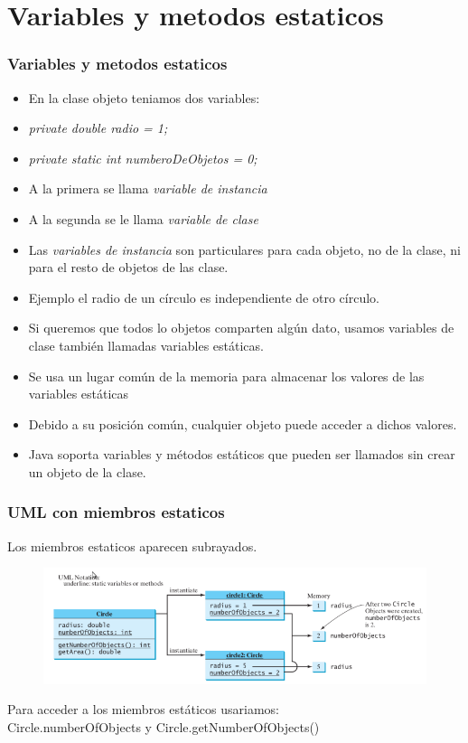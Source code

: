 \documentclass{beamer}
\begin{document}
\section{Variables y metodos estaticos}

\begin{frame}
    \frametitle{Variables y metodos estaticos}
    \begin{itemize}[<+-| alert@+>]

      \item En la clase objeto teniamos dos variables:
      \item \emph{private double radio = 1;}
      \item \emph{private static int numberoDeObjetos = 0;}
      \item A la primera se llama \emph{variable de instancia}
      \item  A la segunda se le llama \emph{variable de clase}
	 \item Las \emph{variables de instancia} son particulares para cada objeto, no de la clase,  ni para el resto de objetos de las clase.      
      \item Ejemplo el radio de un círculo es independiente de otro círculo.
      \item Si queremos que todos lo objetos comparten algún dato, usamos variables de clase también llamadas variables estáticas.
      \item Se usa un lugar común de la memoria para almacenar los valores de las variables estáticas
      \item Debido a su posición común, cualquier objeto puede acceder a dichos valores.
      \item Java soporta variables y  métodos estáticos que pueden ser llamados sin crear un objeto de la clase.
\end{itemize}
\end{frame}



\begin{frame}
    \frametitle{UML con miembros estaticos}
    Los miembros estaticos aparecen subrayados.
\begin{figure}
\includegraphics[scale=0.55]{imagenes/umlstatic.png}
\end{figure}
Para acceder a los miembros estáticos usariamos:\\
\alert{Circle.numberOfObjects} y \alert{Circle.getNumberOfObjects()
}
\end{frame}
\end{document}
